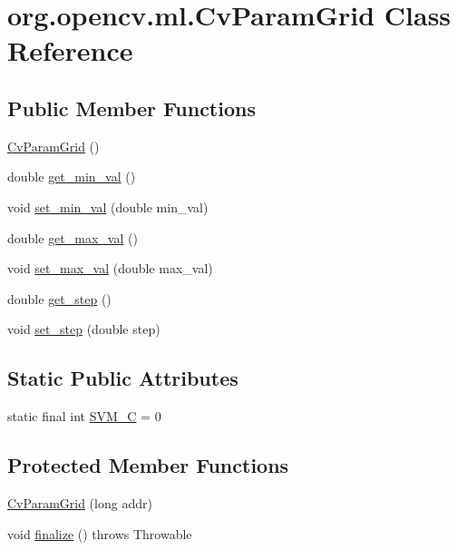 \hypertarget{classorg_1_1opencv_1_1ml_1_1_cv_param_grid}{}\section{org.\+opencv.\+ml.\+Cv\+Param\+Grid Class Reference}
\label{classorg_1_1opencv_1_1ml_1_1_cv_param_grid}
\subsection*{Public Member Functions}
\begin{DoxyCompactItemize}
\item 
\mbox{\hyperlink{classorg_1_1opencv_1_1ml_1_1_cv_param_grid_a409b566be9702a9f184fd0a548ee3d92}{Cv\+Param\+Grid}} ()
\item 
double \mbox{\hyperlink{classorg_1_1opencv_1_1ml_1_1_cv_param_grid_afa3d0c4269f9baf2c21622620abaafe7}{get\+\_\+min\+\_\+val}} ()
\item 
void \mbox{\hyperlink{classorg_1_1opencv_1_1ml_1_1_cv_param_grid_ac5ee1f681067809a0cd6bb48fa411ac5}{set\+\_\+min\+\_\+val}} (double min\+\_\+val)
\item 
double \mbox{\hyperlink{classorg_1_1opencv_1_1ml_1_1_cv_param_grid_a60b9890cbbabd9526e18730cf009774c}{get\+\_\+max\+\_\+val}} ()
\item 
void \mbox{\hyperlink{classorg_1_1opencv_1_1ml_1_1_cv_param_grid_a20b79f13b4154a552ef128c5a17843b6}{set\+\_\+max\+\_\+val}} (double max\+\_\+val)
\item 
double \mbox{\hyperlink{classorg_1_1opencv_1_1ml_1_1_cv_param_grid_a8066afc3b21aa89164ea329acff24993}{get\+\_\+step}} ()
\item 
void \mbox{\hyperlink{classorg_1_1opencv_1_1ml_1_1_cv_param_grid_a4bcde1d01e8a5acc3d13b54206a0e70b}{set\+\_\+step}} (double step)
\end{DoxyCompactItemize}
\subsection*{Static Public Attributes}
\begin{DoxyCompactItemize}
\item 
static final int \mbox{\hyperlink{classorg_1_1opencv_1_1ml_1_1_cv_param_grid_addeb58a617bc6516e19cd763cacdb633}{S\+V\+M\+\_\+C}} = 0
\end{DoxyCompactItemize}
\subsection*{Protected Member Functions}
\begin{DoxyCompactItemize}
\item 
\mbox{\hyperlink{classorg_1_1opencv_1_1ml_1_1_cv_param_grid_a3cb0b612b0dfdba5b7dc81579dce10a7}{Cv\+Param\+Grid}} (long addr)
\item 
void \mbox{\hyperlink{classorg_1_1opencv_1_1ml_1_1_cv_param_grid_af2b8d44b18d54e72dd55d7297cb4e447}{finalize}} ()  throws Throwable 
\end{DoxyCompactItemize}
